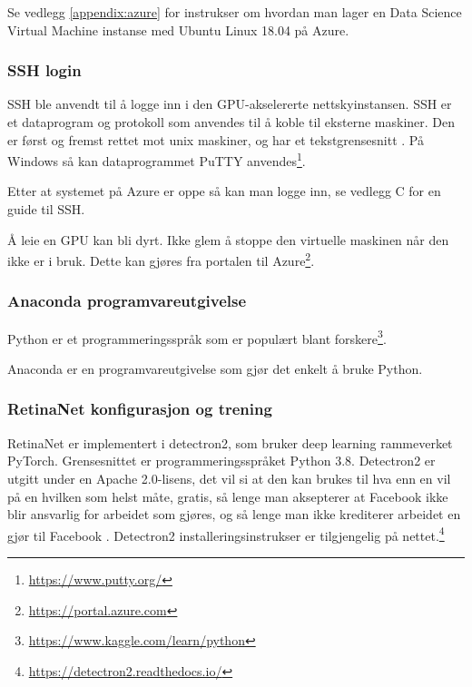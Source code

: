 Se vedlegg \ref{appendix:azure} for instrukser om hvordan man lager en Data Science Virtual Machine instanse med Ubuntu Linux 18.04 på Azure.

\subsubsection{SSH login}

SSH ble anvendt til å logge inn i den GPU-akselererte nettskyinstansen. SSH er et dataprogram og protokoll som anvendes til å koble til eksterne maskiner. Den er først og fremst rettet mot unix maskiner, og har et tekstgrensesnitt \cite{Mallick m.fl. 2020}. På Windows så kan dataprogrammet PuTTY anvendes\footnote{\url{https://www.putty.org/}}.

Etter at systemet på Azure er oppe så kan man logge inn, se vedlegg C for en guide til SSH.%

Å leie en GPU kan bli dyrt. Ikke glem å stoppe den virtuelle maskinen når den ikke er i bruk. Dette kan gjøres fra portalen til Azure\footnote{\url{https://portal.azure.com}}.


\subsubsection{Anaconda programvareutgivelse}

Python er et programmeringsspråk som er populært blant forskere\footnote{\url{https://www.kaggle.com/learn/python}}. \cite{Morris 2020}

Anaconda er en programvareutgivelse som gjør det enkelt å bruke Python.

\subsubsection{RetinaNet konfigurasjon og trening}

RetinaNet er implementert i detectron2, som bruker deep learning rammeverket PyTorch. Grensesnittet er programmeringsspråket Python 3.8. Detectron2 er utgitt under en Apache 2.0-lisens, det vil si at den kan brukes til hva enn en vil på en hvilken som helst måte, gratis, så lenge man aksepterer at Facebook ikke blir ansvarlig for arbeidet som gjøres, og så lenge man ikke krediterer arbeidet en gjør til Facebook \cite{The Apache Software Foundation 2004}. Detectron2 installeringsinstrukser er tilgjengelig på nettet.\footnote{\url{https://detectron2.readthedocs.io/}}

